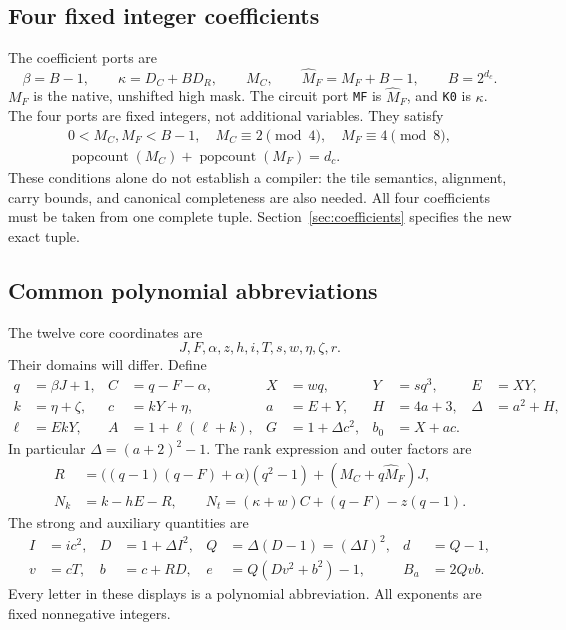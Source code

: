 \documentclass[11pt]{article}
\theoremstyle{remark}\newtheorem{remark}[theorem]{Remark}
\newcommand{\pc}{\operatorname{popcount}}
\begin{document}
\subsection{Four fixed integer coefficients}

The coefficient ports are
\[
\beta=B-1,\qquad \kappa=D_C+BD_R,\qquad M_C,\qquad
\widehat M_F=M_F+B-1,\qquad B=2^{d_c}.
\tag{2.1}
\]
\(M_F\) is the native, unshifted high mask. The circuit port
\texttt{MF} is \(\widehat M_F\), and \texttt{K0} is \(\kappa\).
The four ports are fixed integers, not additional variables.
They satisfy
\[
\begin{gathered}
0<M_C,M_F<B-1,\quad M_C\equiv2\pmod4,\quad M_F\equiv4\pmod8,\\
\pc(M_C)+\pc(M_F)=d_c.
\end{gathered}
\tag{2.2}
\]
These conditions alone do not establish a compiler: the tile semantics,
alignment, carry bounds, and canonical completeness are also needed.
All four coefficients must be taken from one complete tuple.
Section~\ref{sec:coefficients} specifies the new exact tuple.

\subsection{Common polynomial abbreviations}

The twelve core coordinates are
\[
J,F,\alpha,z,h,i,T,s,w,\eta,\zeta,r.
\tag{2.3}
\]
Their domains will differ. Define
\begin{align}
q&=\beta J+1,& C&=q-F-\alpha,&X&=wq,&Y&=sq^3,&E&=XY,\nonumber\\
k&=\eta+\zeta,&c&=kY+\eta,&a&=E+Y,&H&=4a+3,&\Delta&=a^2+H,\tag{2.4}\\
\ell&=EkY,&A&=1+\ell(\ell+k),&
G&=1+\Delta c^2,&b_0&=X+ac.\nonumber
\end{align}
In particular \(\Delta=(a+2)^2-1\).
The rank expression and outer factors are
\begin{align}
R&=\bigl((q-1)(q-F)+\alpha\bigr)(q^2-1)
 +(M_C+q\widehat M_F)J,\tag{2.5}\\
N_k&=k-hE-R,\qquad
N_t=(\kappa+w)C+(q-F)-z(q-1).\tag{2.6}
\end{align}
The strong and auxiliary quantities are
\begin{align}
I&=ic^2,&D&=1+\Delta I^2,&Q&=\Delta(D-1)=(\Delta I)^2,&d&=Q-1,\nonumber\\
v&=cT,&b&=c+RD,&e&=Q(Dv^2+b^2)-1,&B_a&=2Qvb.
\tag{2.7}
\end{align}
Every letter in these displays is a polynomial abbreviation.
All exponents are fixed nonnegative integers.
\end{document}
